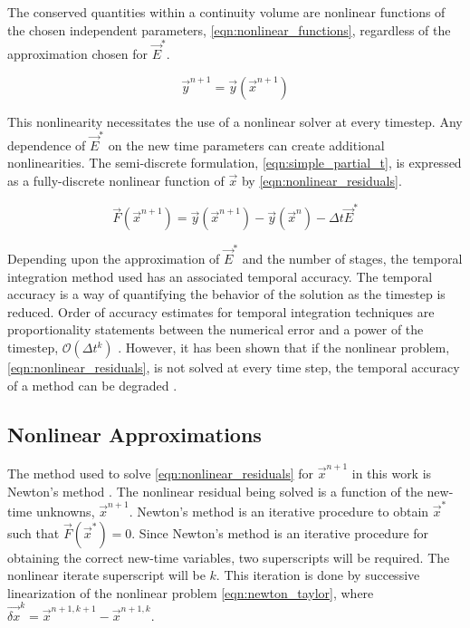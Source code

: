 The conserved quantities within a continuity volume are nonlinear functions of the chosen independent parameters, \eqref{eqn:nonlinear_functions}, regardless of the approximation chosen for $\vec{E}^{*}$.

\begin{equation}
\label{eqn:nonlinear_functions}
\vec{y}^{n+1} = \vec{y}(\vec{x}^{n+1})
\end{equation}

This nonlinearity necessitates the use of a nonlinear solver at every timestep.
Any dependence of $\vec{E}^{*}$ on the new time parameters can create additional nonlinearities.
The semi-discrete formulation, \eqref{eqn:simple_partial_t}, is expressed as a fully-discrete nonlinear function of $\vec{x}$ by \eqref{eqn:nonlinear_residuals}.

\begin{equation}
\label{eqn:nonlinear_residuals}
\vec{F}(\vec{x}^{n+1}) = \vec{y}(\vec{x}^{n+1}) - \vec{y}(\vec{x}^n) -\Delta t \vec{E}^{*}
\end{equation}

Depending upon the approximation of $\vec{E}^{*}$ and the number of stages, the temporal integration method used has an associated temporal accuracy.
The temporal accuracy is a way of quantifying the behavior of the solution as the timestep is reduced.
Order of accuracy estimates for temporal integration techniques are proportionality statements between the numerical error and a power of the timestep, $\mathcal{O}(\Delta t^k)$ \cite{LeVeque2007}. 
However, it has been shown that if the nonlinear problem, \eqref{eqn:nonlinear_residuals}, is not solved at every time step, the temporal accuracy of a method can be degraded \cite{Knoll2001, Mahaffy1993}.

\subsection{Nonlinear Approximations}
\label{subsect:nonlinear_approximations}

The method used to solve \eqref{eqn:nonlinear_residuals} for $\vec{x}^{n+1}$ in this work is Newton's method \cite{Deuflhard2004, Dennis1996}.
The nonlinear residual being solved is a function of the new-time unknowns, $\vec{x}^{n+1}$.
Newton's method is an iterative procedure to obtain $\vec{x}^{*}$ such that $\vec{F}(\vec{x}^{*}) = 0$.
Since Newton's method is an iterative procedure for obtaining the correct new-time variables, two superscripts will be required.
The nonlinear iterate superscript will be $k$.
This iteration is done by successive linearization of the nonlinear problem \eqref{eqn:newton_taylor}, where $\vec{\delta x}^k = \vec{x}^{n+1,k+1} - \vec{x}^{n+1,k}$.

